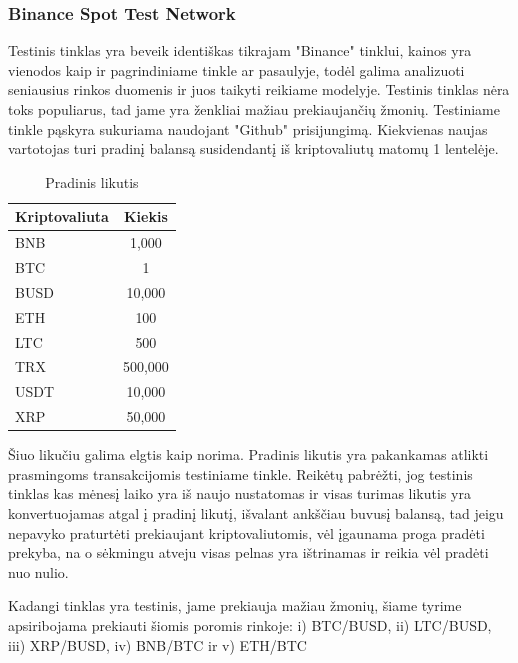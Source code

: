 \documentclass{VUMIFInfKursinis}
\begin{document}
\subsubsection{Binance Spot Test Network}
Testinis tinklas yra beveik identiškas tikrajam "Binance" tinklui, kainos yra vienodos kaip ir pagrindiniame tinkle ar pasaulyje, todėl galima analizuoti 
seniausius rinkos duomenis ir juos taikyti reikiame modelyje. Testinis tinklas nėra toks populiarus, tad jame yra ženkliai mažiau prekiaujančių žmonių. 
Testiniame tinkle pąskyra sukuriama naudojant "Github" prisijungimą. Kiekvienas naujas vartotojas turi pradinį balansą susidendantį iš kriptovaliutų
matomų 1 lentelėje.

\begin{table}[H]\footnotesize
  \centering
  \caption{Pradinis likutis}    %
  {\begin{tabular}{|l|c|} \hline
      Kriptovaliuta & Kiekis  \\
      \hline
      BNB           & 1,000   \\
      BTC           & 1       \\
      BUSD          & 10,000  \\
      ETH           & 100     \\
      LTC           & 500     \\
      TRX           & 500,000 \\
      USDT          & 10,000  \\
      XRP           & 50,000  \\
      \hline 
    \end{tabular}}
\end{table}

Šiuo likučiu galima elgtis kaip norima. Pradinis likutis yra pakankamas atlikti prasmingoms transakcijomis testiniame tinkle. Reikėtų pabrėžti, jog testinis
tinklas kas mėnesį laiko yra iš naujo nustatomas ir visas turimas likutis yra konvertuojamas atgal į pradinį likutį, išvalant ankščiau buvusį balansą, tad jeigu
nepavyko praturtėti prekiaujant kriptovaliutomis, vėl įgaunama proga pradėti prekyba, na o sėkmingu atveju visas pelnas yra ištrinamas ir reikia vėl pradėti
nuo nulio.

Kadangi tinklas yra testinis, jame prekiauja mažiau žmonių, šiame tyrime apsiribojama prekiauti šiomis poromis rinkoje: i) BTC/BUSD, ii) LTC/BUSD, iii) XRP/BUSD,
iv) BNB/BTC ir v) ETH/BTC
\end{document}
